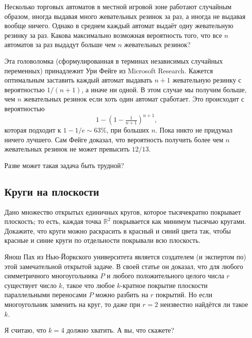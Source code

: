 Несколько торговых автоматов в местной игровой зоне работают случайным образом,
иногда выдавая много жевательных резинок за раз, а иногда не выдавая вообще ничего.
Однако в среднем каждый автомат выдаёт одну жевательную резинку за раз.
Какова максимально возможная вероятность того, что все $n$ автоматов за раз выдадут больше чем $n$ жевательных резинок?

\medskip

Эта головоломка (сформулированная в терминах независимых случайных переменных) принадлежит Ури Фейге из Microsoft Research.
Кажется оптимальным заставить каждый автомат выдавать $n + 1$ жевательную резинку с вероятностью $1/(n + 1)$,
а иначе ни одной.
В этом случае мы получим больше, чем $n$ жевательных резинок если хоть один автомат сработает.
Это происходит с вероятностью
\[1-(1-\tfrac1{n+1})^{n+1},\]
которая подходит к $1 - 1/e \sim 63\%$, при больших $n$.
Пока никто не придумал ничего лучшего.
Сам Фейге доказал, что вероятность получить более чем $n$ жевательных резинок не может превысить $12/13$.

Разве может такая задача быть трудной?

\subsection*{Круги на плоскости}

Дано множество открытых единичных кругов, которое тысячекратно покрывает плоскость;
то есть, каждая точка $\mathbb{R}^2$ покрывается как минимум тысячью кругами.
Докажите, что круги можно раскрасить в красный и синий цвета так,
чтобы красные и синие круги по отдельности покрывали всю плоскость.

\medskip

Янош Пах из Нью-Йоркского университета является создателем (и экспертом по) этой замечательной открытой задаче.
В своей статье \cite{46} он доказал, что для любого симметричного многоугольника $P$ и любого положительного целого числа $r$ существует число $k$, такое что любое $k$-кратное покрытие плоскости параллельными переносами $P$ можно разбить на $r$ покрытий.
Но если многоугольник заменить на круг, то даже при $r = 2$ неизвестно найдётся ли такое $k$.

Я считаю, что $k = 4$ должно хватить.
А вы, что скажете?
